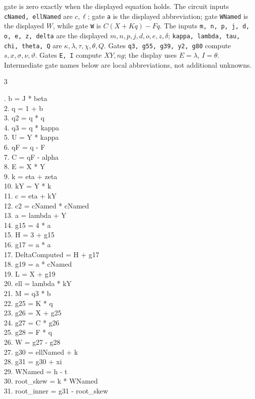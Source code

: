 \documentclass[10pt]{article}
\begin{document}
gate is zero exactly when the displayed equation holds. The circuit inputs
\texttt{cNamed, ellNamed} are $c,\ell$; gate \texttt{a} is the displayed abbreviation; gate \texttt{WNamed} is the
displayed $W$, while gate \texttt{W} is $C(X+Kq)-Fq$. The inputs
\texttt{m, n, p, j, d, o, e, z, delta} are the displayed
$m,n,p,j,d,o,e,z,\delta$; \texttt{kappa, lambda, tau, chi, theta, Q}
are $\kappa,\lambda,\tau,\chi,\theta,Q$. Gates \texttt{q3, g55, g39, y2, g80} compute $s,x,\sigma,\nu,\vartheta$. Gates \texttt{E, I} compute
$XY,ng$; the display uses $E=\lambda$, $I=\theta$. Intermediate gate
names below are local abbreviations, not additional unknowns.
\begin{multicols}{3}
\raggedright\ttfamily\fontsize{7.2}{8.4}. b = J * beta\\
2. q = 1 + b\\
3. q2 = q * q\\
4. q3 = q * kappa\\
5. U = Y * kappa\\
6. qF = q - F\\
7. C = qF - alpha\\
8. E = X * Y\\
9. k = eta + zeta\\
10. kY = Y * k\\
11. c = eta + kY\\
12. c2 = cNamed * cNamed\\
13. a = lambda + Y\\
14. g15 = 4 * a\\
15. H = 3 + g15\\
16. g17 = a * a\\
17. DeltaComputed = H + g17\\
18. g19 = a * cNamed\\
19. L = X + g19\\
20. ell = lambda * kY\\
21. M = q3 * b\\
22. g25 = K * q\\
23. g26 = X + g25\\
24. g27 = C * g26\\
25. g28 = F * q\\
26. W = g27 - g28\\
27. g30 = ellNamed + k\\
28. g31 = g30 + xi\\
29. WNamed = h - t\\
30. root\_skew = k * WNamed\\
31. root\_inner = g31 - root\_skew\\

\end{multicols}
\end{document}
